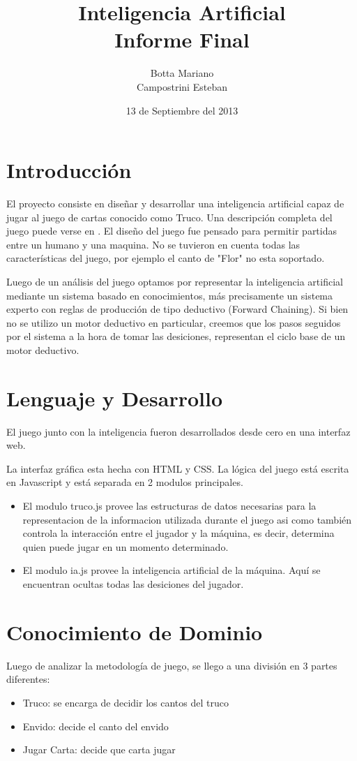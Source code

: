 \documentclass[12pt,a4paper]{article}
\title{Inteligencia Artificial\\ 
\large Informe Final
}
\author{Botta Mariano \\ Campostrini Esteban}
\date{ \small 13 de Septiembre del 2013}
\begin{document}
\maketitle 

\section{Introducci\'on}
El proyecto consiste en diseñar y desarrollar una inteligencia artificial capaz de jugar al juego de cartas conocido como Truco.
Una descripci\'on completa del juego puede verse en \cite{reglas}. El dise\~no del juego fue pensado para permitir partidas 
entre un humano y una maquina. No se tuvieron en cuenta todas las caracter\'isticas del juego, por ejemplo el canto de "Flor" 
no esta soportado. 

Luego de un an\'alisis del juego optamos por representar la inteligencia artificial mediante un sistema basado en conocimientos, 
más precisamente un sistema experto con reglas de producción de tipo deductivo (Forward Chaining). Si bien no se utilizo un motor
deductivo en particular, creemos que los pasos seguidos por el sistema a la hora de tomar las desiciones, representan el ciclo
base de un motor deductivo.

\section{Lenguaje y Desarrollo}
El juego junto con la inteligencia fueron desarrollados desde cero en una interfaz web. 

La interfaz gr\'afica esta hecha con HTML y CSS. La l\'ogica del juego est\'a escrita en Javascript y est\'a separada en 2 modulos principales.  
\begin{itemize}
\item El modulo truco.js provee las estructuras de datos necesarias para la representacion de la informacion utilizada durante el juego
asi como tambi\'en controla la interacci\'on entre el jugador y la m\'aquina, es decir, determina quien puede jugar en un momento determinado.

\item El modulo ia.js provee la inteligencia artificial de la m\'aquina. Aqu\'i se encuentran ocultas todas las desiciones del jugador.

\end{itemize}

\section{Conocimiento de Dominio}
Luego de analizar la metodología de juego, se llego a una división en 3 partes diferentes:
\begin{itemize}
\item Truco: se encarga de decidir los cantos del truco
\item Envido: decide el canto del envido
\item Jugar Carta: decide que carta jugar
\end{itemize}
 
\end{document}
